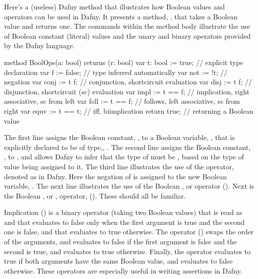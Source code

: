\documentclass[letterpaper,10pt,english]{sphinxmanual}
\begin{document}
Here’s a (useless) Dafny method that illustrates how Boolean values
and operators can be used in Dafny. It presents a method, ,
that takes a Boolean value and returns one. The commands within the
method body illustrate the use of Boolean constant (literal) values
and the unary and binary operators provided by the Dafny language.

\begin{sphinxVerbatim}[commandchars=\\\{\}]
method BoolOps(a: bool) returns (r: bool)
\PYGZob{}
    var t: bool := true;    // explicit type declaration
    var f := false;         // type inferred automatically
    var not := !t;          // negation
    var conj := t \PYGZam{}\PYGZam{} f;     // conjunction, short\PYGZhy{}circuit evaluation
    var disj := t \textbar{}\textbar{} f;     // disjunction, short\PYGZhy{}circuit (sc) evaluation
    var impl := t ==\PYGZgt{} f;    // implication, right associative, sc from left
    var foll := t \PYGZlt{}== f;    // follows, left associative, sc from right
    var equv := t \PYGZlt{}==\PYGZgt{} t;   // iff, bi\PYGZhy{}implication
    return true;            // returning a Boolean value
 \PYGZcb{}
\end{sphinxVerbatim}

The first line assigns the Boolean constant, , to a Boolean
variable, , that is explicitly declared to be of type,, .
The second line assigns the Boolean constant, , to , and
allows Dafny to infer that the type of  must be , based on
the type of value being assigned to it. The third line illustrates the
use of the  operator, denoted as \sphinxstyleemphasis{!} in Dafny. Here the
negation of  is assigned to the new Boolean variable, . The
next line illustrates the use of the Boolean , or 
operator (\sphinxstyleemphasis{\&\&}). Next is the Boolean , or , operator,
(\sphinxstyleemphasis{\textbar{}\textbar{}}). These should all be familiar.

Implication (\sphinxstyleemphasis{==\textgreater{}}) is a binary operator (taking two Boolean values)
that is read as  and that evaluates to false only when the
first argument is true and the second one is false, and that evaluates
to true otherwise. The  operator (\sphinxstyleemphasis{\textless{}==}) swaps the order of
the arguments, and evaluates to false if the first argument is false
and the second is true, and evaluates to true otherwise. Finally, the
 operator evaluates to true if both arguments have the
same Boolean value, and evaluates to false otherwise. These operators
are especially useful in writing assertions in Dafny.
\end{document}
